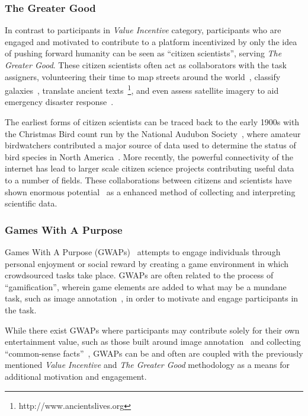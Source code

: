 \documentclass[10pt,twocolumn]{article}
\begin{document}
\subsubsection*{The Greater Good}

In contrast to participants in \textit{Value Incentive} category, 
participants who are engaged and motivated to contribute to a platform 
incentivized by only the idea of pushing forward humanity can be seen 
as ``citizen scientists'', serving \textit{The Greater Good}. These 
citizen scientists often act as collaborators with the task assigners,
volunteering their time to map streets around the world~\cite{Haklay}, 
classify galaxies~\cite{Lintott2008}, translate ancient 
texts~\footnote{http://www.ancientslives.org}, and even assess satellite 
imagery to aid emergency disaster response~\cite{Barrington2012,Goodchild2010}.

The earliest forms of citizen scientists can be traced back to the early 1900s 
with the Christmas Bird count run by the National Audubon 
Society~\cite{Silvertown2009}, where amateur birdwatchers contributed a major 
source of data used to determine the status of bird species in North 
America~\cite{Butcher1990}. More recently, the powerful connectivity of the 
internet has lead to larger scale citizen science projects contributing 
useful data to a number of fields. These collaborations between citizens 
and scientists have shown enormous potential~\cite{Newman2012} as a enhanced
method of collecting and interpreting scientific data.

\subsubsection*{Games With A Purpose}

Games With A Purpose (GWAPs)~\cite{VonAhn2008} attempts to engage individuals
through personal enjoyment or social reward by creating a game environment
in which crowdsourced tasks take place. GWAPs are often related to the 
process of ``gamification'', wherein game elements are added to what may be 
a mundane task, such as image annotation~\cite{VonAhn2004}, in order to motivate 
and engage participants in the task.

While there exist GWAPs where participants may contribute solely for their own 
entertainment value, such as those built around image 
annotation~\cite{VonAhn2004,Ahn2007a,Ahn2006} and collecting ``common-sense 
facts''~\cite{VonAhn2006}, GWAPs can be and often are coupled with the 
previously mentioned \textit{Value Incentive} and \textit{The Greater Good} 
methodology as a means for additional motivation and engagement. 
\end{document}
